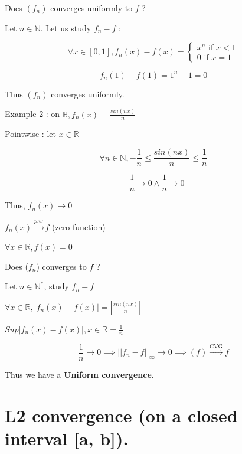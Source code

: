 \documentclass[a4paper,12pt]{article}
\begin{document}
Does $(f_n)$ converges uniformly to $f$ ? \newline

Let $n \in \mathbb{N}$. Let us study $f_n - f$ : \newline

\[
\forall x \in [0, 1], f_n(x) - f(x) = \begin{cases}
    x^n \text{ if } x < 1\\
    0 \text{ if } x = 1
\end{cases}
\]

\[
f_n(1) - f(1) = 1^n - 1 = 0
\]

Thus $(f_n)$ converges uniformly. \newline

Example 2 : on $\mathbb{R}, f_n(x) = \frac{sin(nx)}{n}$ \newline

Pointwise : let $x\in \mathbb{R}$ \newline

\[
\forall n \in \mathbb{N}, -\frac{1}{n} \leq \frac{sin(nx)}{n} \leq \frac{1}{n}
\]

\[-\frac{1}{n} \rightarrow 0 \land \frac{1}{n} \rightarrow 0\]

Thus, $f_n(x) \rightarrow 0$ \newline

$f_n(x) \overset{p.w}{\rightarrow} f$ (zero function) \newline

$\forall x \in \mathbb{R}, f(x) = 0$ \newline

Does ($f_n$) converges to $f$ ? \newline

Let $n \in \mathbb{N}^*$, study $f_n - f$ \newline

$\forall x \in \mathbb{R}, |f_n(x) - f(x)| = |\frac{sin(nx)}{n}|$ \newline

$Sup{|f_n(x) - f(x)|, x \in \mathbb{R}} = \frac{1}{n}$

\[
\frac{1}{n} \rightarrow 0 \implies ||f_n - f||_\infty \rightarrow 0 \implies (f) \overset{\text{CVG}}{\rightarrow} f
\] \newline

Thus we have a \textbf{Uniform convergence}.

\section{L2 convergence (on a closed interval [a, b]).}
\end{document}
